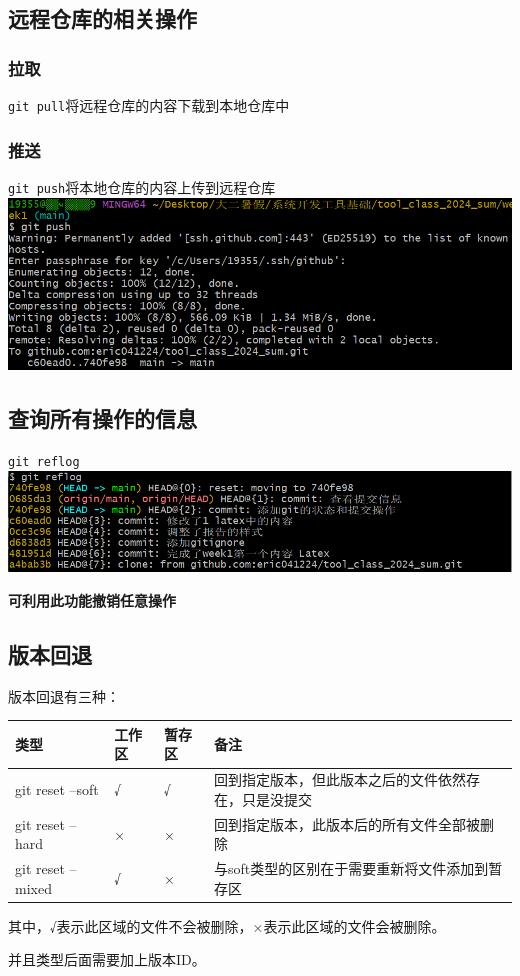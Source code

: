 \documentclass[UTF8,a4paper]{ctexart}
\begin{document}
\subsection{远程仓库的相关操作}
\subsubsection{拉取}
\verb|git pull|\quad 将远程仓库的内容下载到本地仓库中
\subsubsection{推送}
\verb|git push|\quad 将本地仓库的内容上传到远程仓库\\
\includegraphics[width=1\textwidth]{push.png}

\subsection{查询所有操作的信息}
\verb|git reflog|\\
\includegraphics[width=1\textwidth]{reflog.png}\par
\textbf{可利用此功能撤销任意操作}
\subsection{版本回退}
版本回退有三种：\par
\begin{table}[H]
    \centering
    \begin{tabular}{|>{\centering\arraybackslash}p{3cm}|>{\centering\arraybackslash}p{1.5cm}|>{\centering\arraybackslash}p{1.5cm}|>{\centering\arraybackslash}p{5cm}|}
        \hline
        类型 & 工作区 & 暂存区 & 备注\\
        \hline
        git reset --soft & √ & √ & 回到指定版本，但此版本之后的文件依然存在，只是没提交\\
        \hline
        git reset --hard & × & × & 回到指定版本，此版本后的所有文件全部被删除\\
        \hline
        git reset --mixed & √ & × & 与soft类型的区别在于需要重新将文件添加到暂存区\\
        \hline
    \end{tabular}
\end{table}
其中，√表示此区域的文件不会被删除，×表示此区域的文件会被删除。\par
并且类型后面需要加上版本ID。
\end{document}
